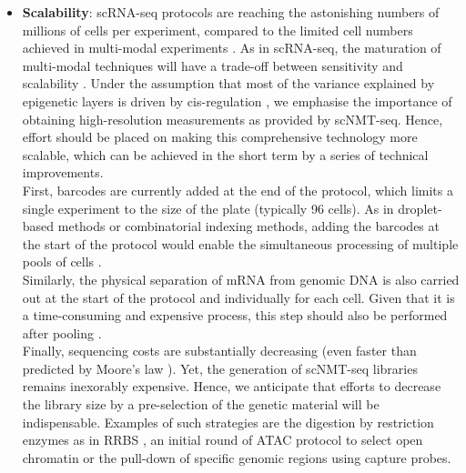 \begin{itemize}

	\item \textbf{Scalability}: scRNA-seq protocols are reaching the astonishing numbers of millions of cells per experiment, compared to the limited cell numbers achieved in multi-modal experiments \cite{Cao2019,Cao2018,Guo2017}. As in scRNA-seq, the maturation of multi-modal techniques will have a trade-off between sensitivity and scalability \cite{Chappell2018}. Under the assumption that most of the variance explained by epigenetic layers is driven by cis-regulation \cite{Bell2011}, we emphasise the importance of obtaining high-resolution measurements as provided by scNMT-seq. Hence, effort should be placed on making this comprehensive technology more scalable, which can be achieved in the short term by a series of technical improvements.\\
	First, barcodes are currently added at the end of the protocol, which limits a single experiment to the size of the plate (typically 96 cells). As in droplet-based methods or combinatorial indexing methods, adding the barcodes at the start of the protocol would enable the simultaneous processing of multiple pools of cells \cite{DR-seq,Mulqueen2018}.\\
	Similarly, the physical separation of mRNA from genomic DNA is also carried out at the start of the protocol and individually for each cell. Given that it is a time-consuming and expensive process, this step should also be performed after pooling \cite{DR-seq}.\\
	Finally, sequencing costs are substantially decreasing (even faster than predicted by Moore's law \cite{Svensson2018}). Yet, the generation of scNMT-seq libraries remains inexorably expensive. Hence, we anticipate that efforts to decrease the library size by a pre-selection of the genetic material will be indispensable. Examples of such strategies are the digestion by restriction enzymes as in RRBS \cite{Guo2013}, an initial round of ATAC protocol to select open chromatin \cite{Spektor2018} or the pull-down of specific genomic regions using capture probes.


\end{itemize}
